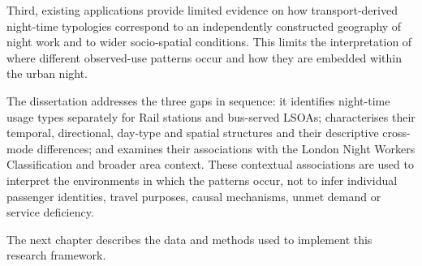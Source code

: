 Third, existing applications provide limited evidence on how transport-derived night-time typologies correspond to an independently constructed geography of night work and to wider socio-spatial conditions. This limits the interpretation of where different observed-use patterns occur and how they are embedded within the urban night.

The dissertation addresses the three gaps in sequence: it identifies night-time usage types separately for Rail stations and bus-served LSOAs; characterises their temporal, directional, day-type and spatial structures and their descriptive cross-mode differences; and examines their associations with the London Night Workers Classification and broader area context. These contextual associations are used to interpret the environments in which the patterns occur, not to infer individual passenger identities, travel purposes, causal mechanisms, unmet demand or service deficiency.

The next chapter describes the data and methods used to implement this research framework.
